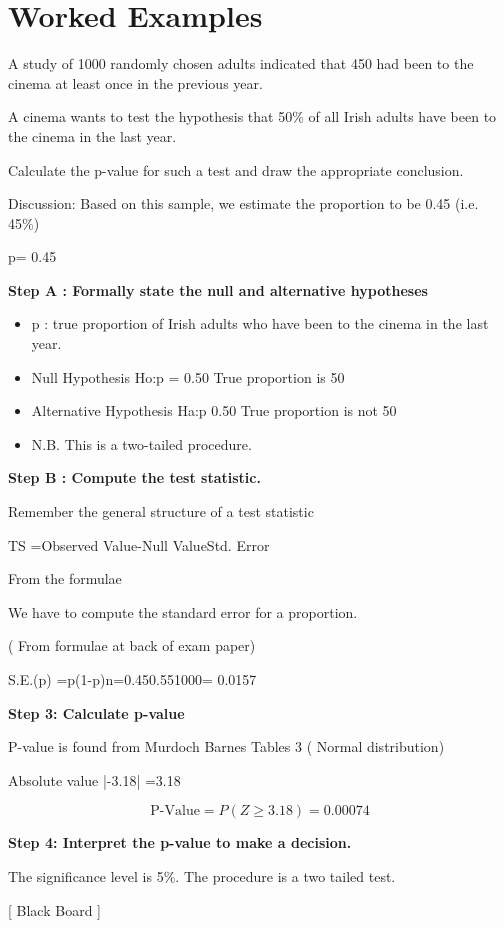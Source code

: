 \documentclass[a4paper,12pt]{article}
\begin{document}
\section{Worked Examples}

A study of 1000 randomly chosen adults indicated that 450 had been to the cinema at least once in the previous year.

A cinema wants to test the hypothesis that 50\% of all Irish adults have been to the cinema in the last year.

Calculate the p-value for such a test and draw the appropriate conclusion.

Discussion: Based on this sample, we estimate the proportion to be 0.45  (i.e. 45\%)

p= 0.45

\noindent \textbf{Step A : Formally state the null and alternative hypotheses}

\begin{itemize}
	\item p : true proportion of Irish adults who have been to the cinema in the last year.
	
	\item	Null Hypothesis               Ho:p = 0.50        True proportion is 50%
	
	\item Alternative Hypothesis      Ha:p 0.50        True proportion is not 50%
	
	
	\item	N.B. This is a two-tailed procedure.
\end{itemize}




\noindent \textbf{Step B : Compute the test statistic.}

Remember the general structure of a test statistic

TS =Observed Value-Null ValueStd. Error 



From the formulae

We have to compute the standard error for a proportion. 

( From formulae at back of exam paper)

S.E.(p) =p(1-p)n=0.450.551000= 0.0157




\noindent \textbf{Step 3: Calculate p-value}

P-value is found from Murdoch Barnes Tables 3 ( Normal distribution)

Absolute value  |-3.18| =3.18




\[ \mbox{P-Value} = P(Z \geq 3.18) = 0.00074\]


\noindent \textbf{Step 4: Interpret the p-value to make a decision.}

The significance level is 5\%.  The procedure is a two tailed test.


[ Black Board ]
\end{document}
